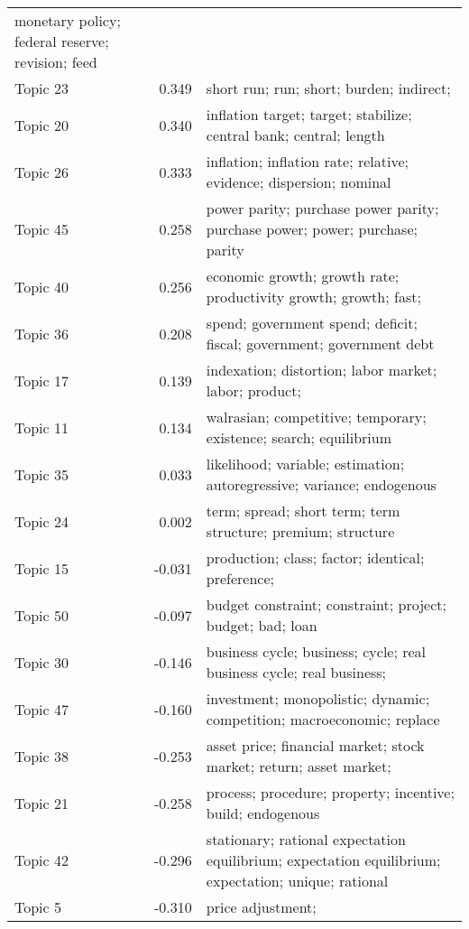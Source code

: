\documentclass[
  12pt,
  onecolumn]{article}
\begin{document}
\begin{longtable}[t]{>{}l>{}r>{\raggedright\arraybackslash}m{25em}}
monetary
policy;
federal
reserve;
revision;
feed\\
Topic 23 & 0.349 & short
run;
run;
short;
burden;
indirect;
\cellcolor{gray!6}{externality}\\
\addlinespace
Topic 20 & 0.340 & inflation
target;
target;
stabilize;
central
bank;
central;
length\\
Topic 26 & 0.333 & inflation;
inflation
rate;
relative;
evidence;
dispersion;
nominal
\cellcolor{gray!6}{price}\\
Topic 45 & 0.258 & power
parity;
purchase
power
parity;
purchase
power;
power;
purchase;
parity\\
Topic 40 & 0.256 & economic
growth;
growth
rate;
productivity
growth;
growth;
fast;
\cellcolor{gray!6}{region}\\
Topic 36 & 0.208 & spend;
government
spend;
deficit;
fiscal;
government;
government
debt\\
\addlinespace
Topic 17 & 0.139 & indexation;
distortion;
labor
market;
labor;
product;
\cellcolor{gray!6}{corporate}\\
Topic 11 & 0.134 & walrasian;
competitive;
temporary;
existence;
search;
equilibrium\\
Topic 35 & 0.033 & likelihood;
variable;
estimation;
autoregressive;
variance;
endogenous
\cellcolor{gray!6}{variable}\\
Topic 24 & 0.002 & term;
spread;
short
term;
term
structure;
premium;
structure\\
Topic 15 & -0.031 & production;
class;
factor;
identical;
preference;
\cellcolor{gray!6}{input}\\
\addlinespace
Topic 50 & -0.097 & budget
constraint;
constraint;
project;
budget;
bad;
loan\\
Topic 30 & -0.146 & business
cycle;
business;
cycle;
real
business
cycle;
real
business;
\cellcolor{gray!6}{volatility}\\
Topic 47 & -0.160 & investment;
monopolistic;
dynamic;
competition;
macroeconomic;
replace\\
Topic 38 & -0.253 & asset
price;
financial
market;
stock
market;
return;
asset
market;
\cellcolor{gray!6}{stock}\\
Topic 21 & -0.258 & process;
procedure;
property;
incentive;
build;
endogenous\\
\addlinespace
Topic 42 & -0.296 & stationary;
rational
expectation
equilibrium;
expectation
equilibrium;
expectation;
unique;
rational
\cellcolor{gray!6}{expectation}\\
Topic 5 & -0.310 & price
adjustment;

\end{longtable}
\end{document}

